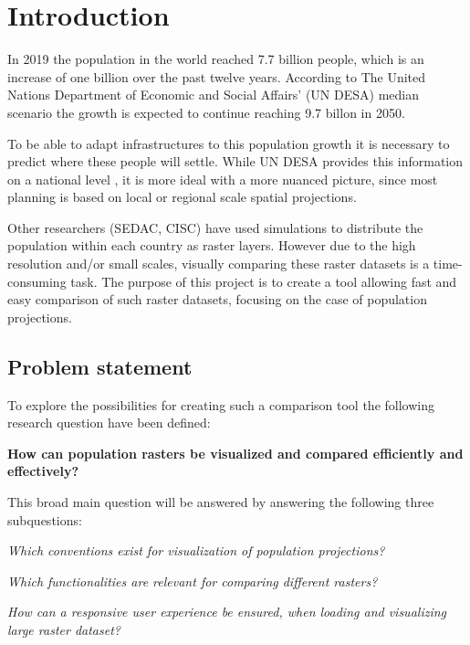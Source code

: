 \chapter{Introduction}
In 2019 the population in the world reached 7.7 billion people, which is an increase of one billion over the past twelve years. According to The United Nations Department of Economic and Social Affairs’ (UN DESA) median scenario the growth is expected to continue reaching 9.7 billon in 2050. \citep{UNDEASHightlights} 

To be able to adapt infrastructures to this population growth it is necessary to predict where these people will settle. While UN DESA provides this information on a national level \citep{NationalPop}, it is more ideal with a more nuanced picture, since most planning is based on local or regional scale spatial projections. \citep{WhyDetailedPop}

Other researchers (SEDAC, CISC) have used simulations to distribute the population within each country as raster layers. However due to the high resolution and/or small scales, visually comparing these raster datasets is a time-consuming task. The purpose of this project is to create a tool allowing fast and easy comparison of such raster datasets, focusing on the case of population projections.


\section{Problem statement}

To explore the possibilities for creating such a comparison tool the following research question have been defined:

\textbf{How can population rasters be visualized and compared efficiently and effectively?}

This broad main question will be answered by answering the following three subquestions:

\textit{Which conventions exist for visualization of population projections?}

\textit{Which functionalities are relevant for comparing different rasters?}

\textit{How can a responsive user experience be ensured, when loading and visualizing large raster dataset?}



